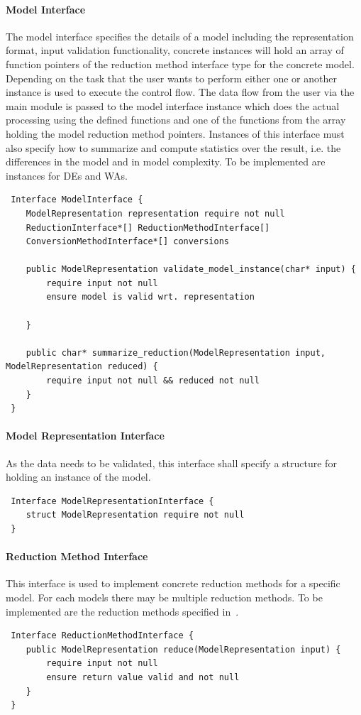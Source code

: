 			\paragraph{Model Interface}
                The model interface specifies the details of a model including the representation format, input validation functionality, concrete instances will hold an array of function pointers of the reduction method interface type for the concrete model. Depending on the task that the user wants to perform either one or another instance is used to execute the control flow. The data flow from the user via the main module is passed to the model interface instance which does the actual processing using the defined functions and one of the functions from the array holding the model reduction method pointers. Instances of this interface must also specify how to summarize and compute statistics over the result, i.e. the differences in the model and in model complexity. To be implemented are instances for DEs and WAs.
\begin{verbatim}
 Interface ModelInterface {
    ModelRepresentation representation require not null
    ReductionInterface*[] ReductionMethodInterface[]
    ConversionMethodInterface*[] conversions
    
    public ModelRepresentation validate_model_instance(char* input) {
        require input not null
        ensure model is valid wrt. representation
        
    }

    public char* summarize_reduction(ModelRepresentation input, ModelRepresentation reduced) {
        require input not null && reduced not null
    }
 }
\end{verbatim}

            \paragraph{Model Representation Interface}
                As the data needs to be validated, this interface shall specify a structure for holding an instance of the model.
\begin{verbatim}
 Interface ModelRepresentationInterface {
    struct ModelRepresentation require not null
 }
\end{verbatim}

			
			\paragraph{Reduction Method Interface}
                This interface is used to implement concrete reduction methods for a specific model. For each models there may be multiple reduction methods. To be implemented are the reduction methods specified in~\autocite{Cardelli2017MaximalAO, Kiefer2013OnTC}. 
\begin{verbatim}
 Interface ReductionMethodInterface {
    public ModelRepresentation reduce(ModelRepresentation input) {
        require input not null
        ensure return value valid and not null
    }
 }
\end{verbatim}

